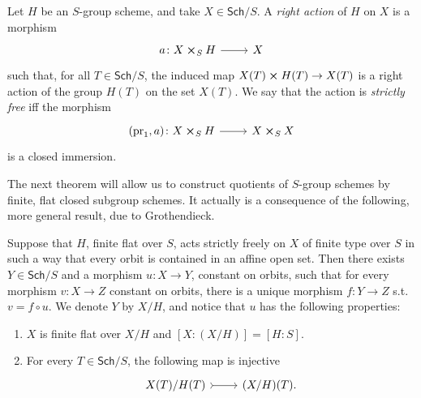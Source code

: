 \begin{defn}
	Let $H$ be an $S$-group scheme, and take $X \in \mathsf{Sch}/S$.
	A {\em right action} of $H$ on $X$ is a morphism
	\begin{equation*}
	\begin{tikzcd}[row sep = 0ex
		,/tikz/column 1/.append style={anchor=base east}
		,/tikz/column 2/.append style={anchor=base west}]
		a\colon X \cross_{ S } H \arrow[r, "", rightarrow] &
		X
	\end{tikzcd}
	\end{equation*} 
	such that, for all $T \in \mathsf{Sch}/S$, the induced map
	$X(T) \cross H(T) \to  X(T)$ is a right action of the
	group $H(T)$ on the set $X(T)$.
	We say that the action is {\em strictly free} iff the morphism
	\begin{equation*}
	\begin{tikzcd}[row sep = 0ex
		,/tikz/column 1/.append style={anchor=base east}
		,/tikz/column 2/.append style={anchor=base west}]
		(\mathrm{pr}_1, a)\colon X \cross_{ S } H \arrow[r, "", rightarrow] &
		X \cross_{ S } X
	\end{tikzcd}
	\end{equation*} 
	is a closed immersion.
\end{defn}


\noindent
The next theorem will allow us to construct quotients of
$S$-group schemes by finite, flat closed subgroup schemes.
It actually is a consequence of the following, more general result, due to Grothendieck.
\begin{thm}
	Suppose that $H$, finite flat over $S$, acts strictly freely on $X$
	of finite type over $S$ in such a way that every orbit is contained in an affine open set.
	Then there exists $Y \in \mathsf{Sch}/S$ and a morphism $u\colon X \to Y$,
	constant on orbits, such that for every morphism $v\colon X \to Z$ constant on orbits,
	there is a unique morphism $f\colon Y \to Z$ s.t. $v = f \circ u$.
	We denote $Y$ by $X/H$, and notice that $u$ has the following properties:
\begin{enumerate}
	\item $X$ is finite flat over $X/H$ and $[X:(X/H)] = [H:S]$.
		
	\item For every $T \in \mathsf{Sch}/S$, the following map is injective
		\begin{equation*}
		\begin{tikzcd}
			X(T)/H(T) \arrow[r, "", rightarrowtail] &
			(X/H)(T)
		.\end{tikzcd}
		\end{equation*}
\end{enumerate}
\end{thm}



